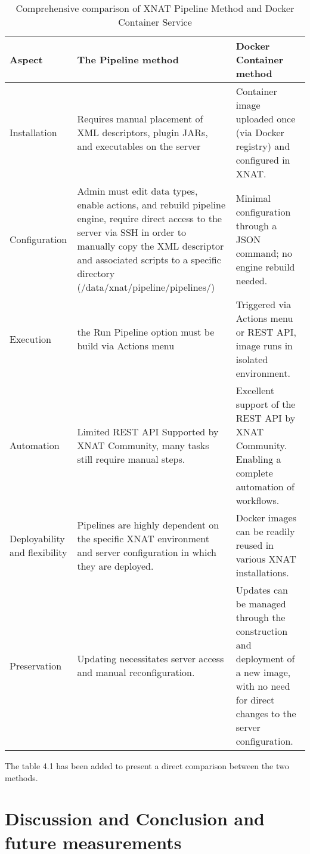 \begin{table}[H]
    \centering
      \begin{tabular}{|>{\centering\arraybackslash}p{4cm}|
                    >{\centering\arraybackslash}p{5cm}|
                    >{\centering\arraybackslash}p{5cm}|}
    \hline
    \textbf{Aspect} & \textbf{The Pipeline method} & \textbf{Docker Container method}\\ \hline
     Installation & Requires manual placement of XML descriptors, plugin JARs, and executables on the server& Container image uploaded once (via Docker registry) and configured in XNAT. \\ \hline
    Configuration & Admin must edit data types, enable actions, and rebuild pipeline engine, require direct access to the server via SSH in order to manually copy the XML
descriptor and associated scripts to a specific directory (/data/xnat/pipeline/pipelines/)& Minimal configuration through a JSON command; no engine rebuild needed. \\ \hline
Execution & the Run Pipeline option must be build via Actions menu  & Triggered via Actions menu or REST API, image runs in isolated environment. \\ \hline
Automation & Limited REST API Supported by XNAT Community, many tasks still require manual steps.& Excellent support of the REST API by XNAT Community. Enabling a complete automation of workflows. \\ \hline
Deployability and flexibility & Pipelines are highly dependent on the specific XNAT environment and server configuration in which they are deployed. & Docker images can be readily reused in various XNAT installations.\\ \hline
Preservation & Updating necessitates server access and manual reconfiguration.& Updates can be managed through the construction and deployment of a new image, with no need for direct changes to the server configuration.\\ \hline
    \end{tabular}
    \caption{Comprehensive comparison of XNAT Pipeline Method and Docker Container Service}
    \label{tab:pipeline-vs-docker}
\end{table}
 The table 4.1 has been added to present a direct comparison between the two methods.
\section{Discussion and Conclusion and future measurements}



